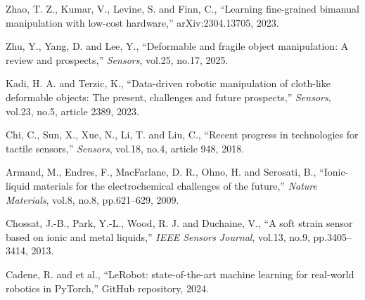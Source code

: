 Zhao, T. Z., Kumar, V., Levine, S. and Finn, C.,
``Learning fine-grained bimanual manipulation with low-cost hardware,''
arXiv:2304.13705, 2023.

Zhu, Y., Yang, D. and Lee, Y.,
``Deformable and fragile object manipulation: A review and prospects,''
{\it Sensors}, vol.25, no.17, 2025.

Kadi, H. A. and Terzic, K.,
``Data-driven robotic manipulation of cloth-like deformable objects: The present, challenges and future prospects,''
{\it Sensors}, vol.23, no.5, article 2389, 2023.

Chi, C., Sun, X., Xue, N., Li, T. and Liu, C.,
``Recent progress in technologies for tactile sensors,''
{\it Sensors}, vol.18, no.4, article 948, 2018.

Armand, M., Endres, F., MacFarlane, D. R., Ohno, H. and Scrosati, B.,
``Ionic-liquid materials for the electrochemical challenges of the future,''
{\it Nature Materials}, vol.8, no.8, pp.621--629, 2009.

Chossat, J.-B., Park, Y.-L., Wood, R. J. and Duchaine, V.,
``A soft strain sensor based on ionic and metal liquids,''
{\it IEEE Sensors Journal}, vol.13, no.9, pp.3405--3414, 2013.

Cadene, R. and et al.,
``LeRobot: state-of-the-art machine learning for real-world robotics in PyTorch,''
GitHub repository, 2024.
